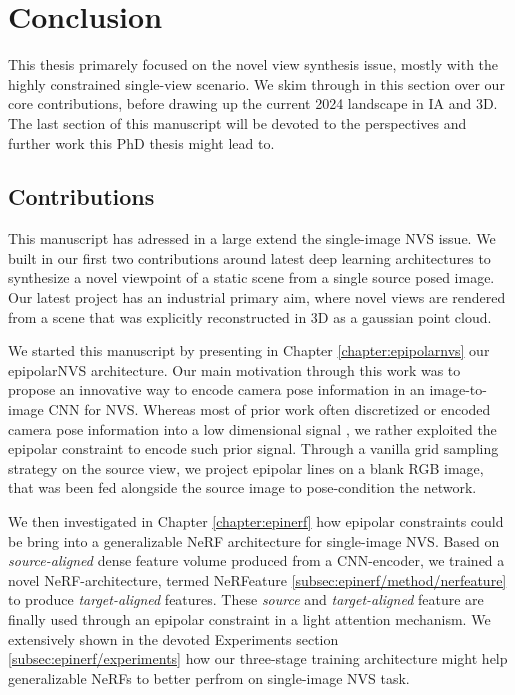 \chapter{Conclusion}
\label{chapter:conclusion}

{}


This thesis primarely focused on the novel view synthesis issue, mostly with the highly constrained single-view scenario. We skim through in this section over our core contributions, before drawing up  the current 2024 landscape in \ac{IA} and 3D. The last section of this manuscript will be devoted to the perspectives and further work this PhD thesis might lead to. 

\section{Contributions}

This manuscript has adressed in a large extend the single-image \ac{NVS} issue. We built in our first two contributions around latest deep learning architectures to synthesize a novel viewpoint of a static scene from a single source posed image. Our latest project has an industrial primary aim, where novel views are rendered from a scene that was explicitly reconstructed in 3D as a gaussian point cloud.

We started this manuscript by presenting in Chapter \ref{chapter:epipolarnvs} our epipolarNVS architecture. Our main motivation through this work was to propose an innovative way to encode camera pose information in an image-to-image \ac{CNN} for \ac{NVS}. Whereas most of prior work often discretized \citep{kim2020novel} or encoded camera pose information into a low dimensional signal \citep{sun2018multiview}, we rather exploited the epipolar constraint to encode such prior signal. Through a vanilla grid sampling strategy on the source view, we project epipolar lines on a blank RGB image, that was been fed alongside the source image to pose-condition the network. 

We then investigated in Chapter \ref{chapter:epinerf} how epipolar constraints could be bring into a generalizable \ac{NeRF} architecture for single-image \ac{NVS}. Based on \textit{source-aligned} dense feature volume produced from a CNN-encoder, we trained a novel \ac{NeRF}-architecture, termed NeRFeature \ref{subsec:epinerf/method/nerfeature} to produce \textit{target-aligned} features. These \textit{source} and \textit{target-aligned} feature are finally used through an epipolar constraint in a light attention mechanism. We extensively shown in the devoted Experiments section \ref{subsec:epinerf/experiments} how our three-stage training architecture might help generalizable \ac{NeRF}s to better perfrom on single-image \ac{NVS} task.  

